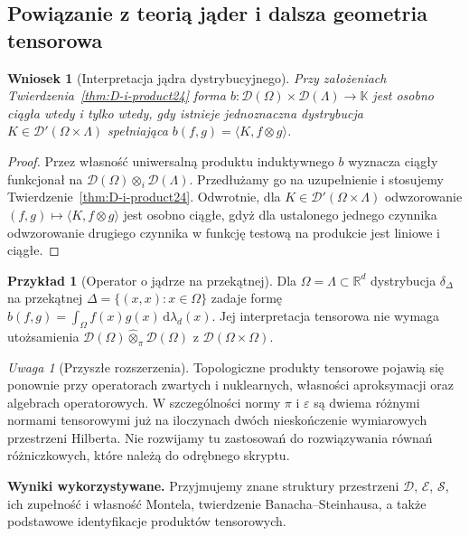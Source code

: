\documentclass[11pt,a4paper]{article}
\numberwithin{equation}{section}
\theoremstyle{plain}
\newtheorem{wniosek}[twierdzenie]{Wniosek}
\theoremstyle{definition}
\newtheorem{przyklad}[twierdzenie]{Przykład}
\theoremstyle{remark}
\newtheorem{uwaga}[twierdzenie]{Uwaga}
\newcommand{\R}{\mathbb R}
\newcommand{\K}{\mathbb K}
\begin{document}
\subsection{Powiązanie z teorią jąder i dalsza geometria tensorowa}

\begin{wniosek}[Interpretacja jądra dystrybucyjnego]
\label{cor:kernel-i24}
Przy założeniach Twierdzenia~\ref{thm:D-i-product24}
forma $b:\mathcal D(\Omega)\times\mathcal D(\Lambda)\to\K$
jest osobno ciągła wtedy i tylko wtedy, gdy istnieje
jednoznaczna dystrybucja $K\in\mathcal D'(\Omega\times\Lambda)$
spełniająca $b(f,g)=\langle K,f\otimes g\rangle$.
\end{wniosek}
\begin{proof}
Przez własność uniwersalną produktu induktywnego
$b$ wyznacza ciągły funkcjonał na
$\mathcal D(\Omega)\otimes_i\mathcal D(\Lambda)$.
Przedłużamy go na uzupełnienie i stosujemy
Twierdzenie~\ref{thm:D-i-product24}. Odwrotnie, dla
$K\in\mathcal D'(\Omega\times\Lambda)$ odwzorowanie
$(f,g)\mapsto\langle K,f\otimes g\rangle$ jest osobno
ciągłe, gdyż dla ustalonego jednego czynnika
odwzorowanie drugiego czynnika w funkcję testową
na produkcie jest liniowe i ciągłe.
\end{proof}

\begin{przyklad}[Operator o jądrze na przekątnej]
\label{ex:diag-tensor24}
Dla $\Omega=\Lambda\subset\R^d$ dystrybucja
$\delta_\Delta$ na przekątnej $\Delta=\{(x,x):x\in\Omega\}$
zadaje formę $b(f,g)=\int_\Omega f(x)g(x)\,\mathrm d\lambda_d(x)$.
Jej interpretacja tensorowa nie wymaga utożsamienia
$\mathcal D(\Omega)\widehat\otimes_\pi\mathcal D(\Omega)$
z $\mathcal D(\Omega\times\Omega)$.
\end{przyklad}

\begin{uwaga}[Przyszłe rozszerzenia]
\label{rem:tensor-next24}
Topologiczne produkty tensorowe pojawią się ponownie
przy operatorach zwartych i nuklearnych, własności
aproksymacji oraz algebrach operatorowych.
W szczególności normy $\pi$ i $\varepsilon$ są dwiema
różnymi normami tensorowymi już na iloczynach dwóch
nieskończenie wymiarowych przestrzeni Hilberta.
Nie rozwijamy tu zastosowań do rozwiązywania równań
różniczkowych, które należą do odrębnego skryptu.
\end{uwaga}


\setcounter{section}{24}
\noindent\textbf{Wyniki wykorzystywane.} Przyjmujemy znane
struktury przestrzeni $\mathcal D$, $\mathcal E$, $\mathcal S$,
ich zupełność i własność Montela, twierdzenie Banacha--Steinhausa,
a także podstawowe identyfikacje produktów tensorowych.
\par\medskip
\end{document}
